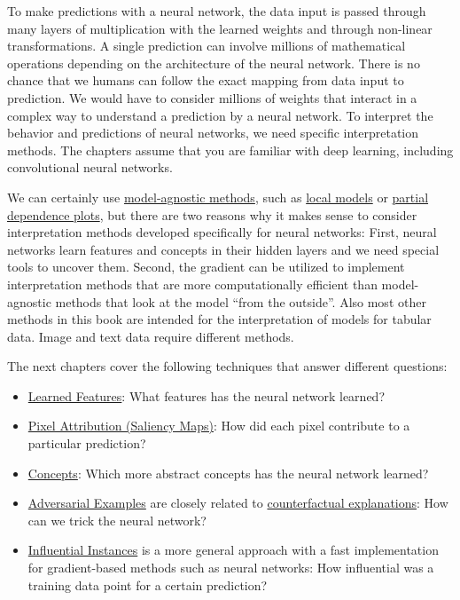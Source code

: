 \documentclass[12pt,]{krantz}
\providecommand{\tightlist}{%
  \setlength{\itemsep}{0pt}\setlength{\parskip}{0pt}}
\begin{document}
To make predictions with a neural network, the data input is passed
through many layers of multiplication with the learned weights and
through non-linear transformations. A single prediction can involve
millions of mathematical operations depending on the architecture of the
neural network. There is no chance that we humans can follow the exact
mapping from data input to prediction. We would have to consider
millions of weights that interact in a complex way to understand a
prediction by a neural network. To interpret the behavior and
predictions of neural networks, we need specific interpretation methods.
The chapters assume that you are familiar with deep learning, including
convolutional neural networks.

We can certainly use \protect\hyperlink{agnostic}{model-agnostic
methods}, such as \protect\hyperlink{lime}{local models} or
\protect\hyperlink{pdp}{partial dependence plots}, but there are two
reasons why it makes sense to consider interpretation methods developed
specifically for neural networks: First, neural networks learn features
and concepts in their hidden layers and we need special tools to uncover
them. Second, the gradient can be utilized to implement interpretation
methods that are more computationally efficient than model-agnostic
methods that look at the model ``from the outside''. Also most other
methods in this book are intended for the interpretation of models for
tabular data. Image and text data require different methods.

The next chapters cover the following techniques that answer different
questions:

\begin{itemize}
\tightlist
\item
  \protect\hyperlink{feature-visualization}{Learned Features}: What
  features has the neural network learned?
\item
  \protect\hyperlink{pixel-attribution}{Pixel Attribution (Saliency
  Maps)}: How did each pixel contribute to a particular prediction?
\item
  \protect\hyperlink{neural-concepts}{Concepts}: Which more abstract
  concepts has the neural network learned?
\item
  \protect\hyperlink{adversarial}{Adversarial Examples} are closely
  related to \protect\hyperlink{counterfactual}{counterfactual
  explanations}: How can we trick the neural network?
\item
  \protect\hyperlink{influential}{Influential Instances} is a more
  general approach with a fast implementation for gradient-based methods
  such as neural networks: How influential was a training data point for
  a certain prediction?
\end{itemize}
\end{document}

